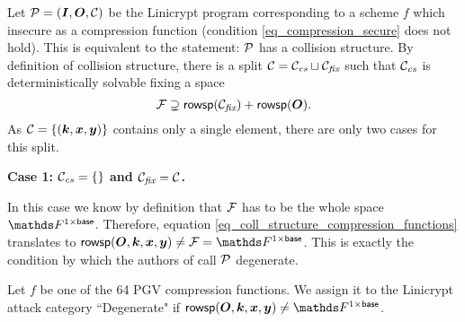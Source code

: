 Let $\P = (\I, \O, \C)$ be the Linicrypt program corresponding to a scheme $f$ which insecure as a compression function
(condition \eqref{eq_compression_secure} does not hold).
This is equivalent to the statement:
$\P$ has a collision structure.
By definition of collision structure,
there is a split $\C = \Ccs \sqcup \Cfix$ such that $\Ccs$ is deterministically solvable fixing a space
\begin{equation}
\label{eq_coll_structure_compression_functions}
\Fix \supsetneq \rowsp(\Cfix) + \rowsp(\O).
\end{equation}
As $\C = \{(\vk, \vx, \vy)\}$ contains only a single element,
there are only two cases for this split.

\textbf{Case 1: $\Ccs = \{\}$ and $\Cfix = \C$.}

In this case we know by definition that $\Fix$ has to be the whole space $\Frowsp$.
Therefore, equation \ref{eq_coll_structure_compression_functions} translates to
$\rowsp(\O, \vk, \vx, \vy) \neq \Fix = \Frowsp$.
This is exactly the condition by which the authors of \cite{TCC:McQSwoRos19} call $\P$ degenerate.

\begin{defn}
    Let $f$ be one of the 64 PGV compression functions.
    We assign it to the Linicrypt attack category ``Degenerate" if $\rowsp(\O,\vk,\vx,\vy) \neq \Frowsp$.
\end{defn}

